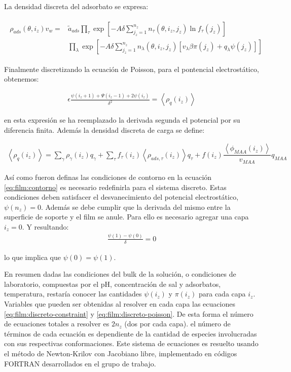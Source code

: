 La densidad discreta del adsorbato  se expresa:


\begin{align}
	\begin{aligned}
		\rho_{ads}(\theta, i_z)v_w = &\tilde{a}_{ads} \prod_\tau\exp\left[-A \delta \sum^{n_z}_{j_z = 1} n_\tau(\theta,i_z,j_z) \ln f_\tau(j_z)\right] \\
		& \prod_\lambda \exp \left[-A \delta \sum^{n_z}_{j_z = 1}  n_\lambda(\theta,i_z, j_z)[v_\lambda\beta\pi(j_z) + q_\lambda \psi(j_z)] \right]
	\end{aligned}
\end{align}

Finalmente discretizando la ecuaci\'on de Poisson, para el pontencial electrost\'atico, obtenemos:

\begin{align}
	\epsilon \frac{\psi(i_z +1) + \Psi(i_z -1) +2\psi(i_z)}{\delta^2} = \left< \rho_q(i_z)\right>
	\label{eq:film:discreto-poisson}
\end{align}

\noindent en esta expresi\'on se ha reemplazado la derivada segunda el potencial por su diferencia finita. Adem\'as la densidad discreta de carga se define:


\begin{align}
	\left<\rho_q(i_z)\right> = \sum_{\gamma } {\rho_\gamma(i_z) q_\gamma + \sum_\tau{f_\tau(i_z) \left<\rho_{ads,\tau}(i_z)\right> q_\tau} +  f(i_z)\dfrac{\left<\phi_{MAA}(i_z)\right>}{v_{MAA}}q_{MAA}}
	\label{eq:film:rho_charge-discreto}
\end{align}


As\'i como fueron definas las condiciones de contorno en la ecuaci\'on \ref{eq:film:contorno} es necesario redefinirla para el sistema discreto. Estas condiciones deben satisfacer el desvanecimiento del potencial electrost\'atico, $\psi(n_z) =0 $. Adem\'as se debe cumplir que la derivada del mismo entre la superficie de soporte y el film se anule.
Para ello es necesario agregar una capa $i_z = 0$.
Y resultando:
\begin{align}
	\frac{\psi(1) - \psi(0)}{\delta} = 0
\end{align}

\noindent lo que implica que $\psi(0) =  \psi(1)$.

En resumen dadas las condiciones del bulk de la soluci\'on, o condiciones de laboratorio, compuestas por el pH, concentraci\'on de sal y adsorbatos, temperatura, restar\'ia conocer las cantidades $\psi(i_z)$ y $\pi(i_z)$ para cada capa $i_z$. Variables que pueden ser obtenidas al resolver en cada capa las ecuaciones \ref{eq:film:discreto-constraint} y \ref{eq:film:discreto-poisson}.
De esta forma el n\'umero de ecuaciones totales a resolver es $2n_z$ (dos por cada capa). el n\'umero de t\'erminos de cada ecuaci\'on es dependiente de la cantidad de especies involucradas con sus respectivas conformaciones. 
Este sistema de ecuaciones es resuelto usando el m\'etodo de Newton-Krilov con Jacobiano libre, implementado en c\'odigos FORTRAN desarrollados en el grupo de trabajo.



